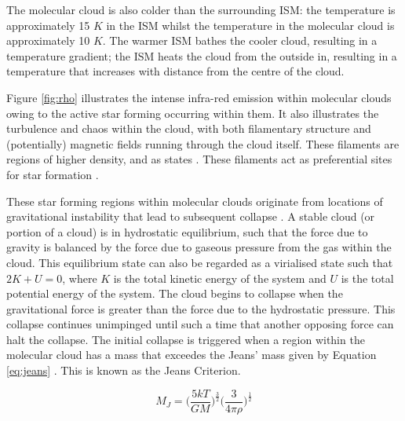 \documentclass{report}
\begin{document}
The molecular cloud is also colder than the surrounding ISM: the temperature is approximately 15 $K$ in the ISM whilst the temperature in the molecular cloud is approximately 10 $K$. The warmer ISM bathes the cooler cloud, resulting in a temperature gradient; the ISM heats the cloud from the outside in, resulting in a temperature that increases with distance from the centre of the cloud.

Figure \ref{fig:rho} illustrates the intense infra-red emission within molecular clouds owing to the active star forming occurring within them. It also illustrates the turbulence and chaos within the cloud, with both filamentary structure and (potentially) magnetic fields running through the cloud itself. These filaments are regions of higher density, and as \textcite{evo-mol} states . These filaments act as preferential sites for star formation \parencite{filaments}.

These star forming regions within molecular clouds originate from locations of gravitational instability that lead to subsequent collapse \parencite{jeans}. A stable cloud (or portion of a cloud) is in hydrostatic equilibrium, such that the force due to gravity is balanced by the force due to gaseous pressure from the gas within the cloud. This equilibrium state can also be regarded as a virialised state such that $2K+U=0$, where $K$ is the total kinetic energy of the system and $U$ is the total potential energy of the system. The cloud begins to collapse when the gravitational force is greater than the force due to the hydrostatic pressure. This collapse continues unimpinged until such a time that another opposing force can halt the collapse. The initial collapse is triggered when a region within the molecular cloud has a mass that exceedes the Jeans' mass given by Equation \ref{eq:jeans} \parencite{lecture}. This is known as the Jeans Criterion.

\begin{equation}\label{eq:jeans}
  M_{J} = \Bigg( \frac{5kT}{GM} \Bigg )^\frac{3}{2} \Bigg( \frac{3}{4\pi\rho} \Bigg )^\frac{1}{2}
\end{equation}
\end{document}
